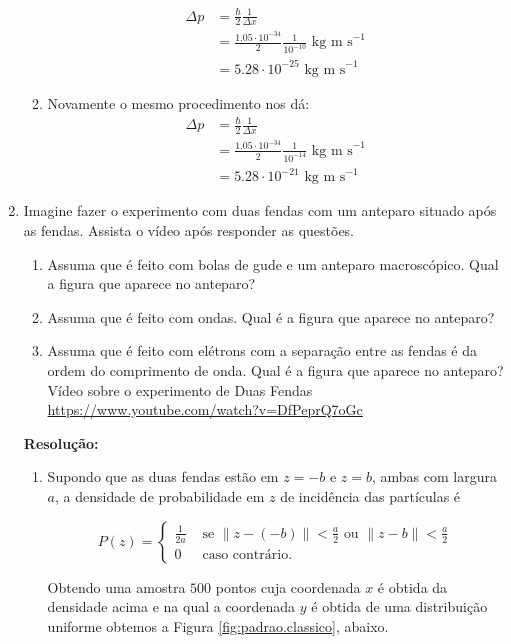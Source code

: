 \documentclass[a4paper, 12pt, notitlepage]{article}
\begin{document}
\begin{enumerate}
\begin{enumerate}
  \begin{align*}
  \Delta p &= \frac{\hbar}{2} \frac{1}{\Delta x} \\
  &= \frac{1.05 \cdot 10^{-34}}{2} \frac{1}{10^{-10}} \text{ kg m s}^{-1} \\
  &= 5.28 \cdot 10^{-25} \text{ kg m s}^{-1}
  \end{align*}
  
  \item Novamente o mesmo procedimento nos dá:
  \begin{align*}
  \Delta p &= \frac{\hbar}{2} \frac{1}{\Delta x} \\
  &= \frac{1.05 \cdot 10^{-34}}{2} \frac{1}{10^{-14}} \text{ kg m s}^{-1} \\
  &= 5.28 \cdot 10^{-21} \text{ kg m s}^{-1}
  \end{align*}
\end{enumerate}

\item Imagine fazer o experimento com duas fendas com um anteparo situado após as fendas. Assista o vídeo após responder as questões.
\begin{enumerate}
  \item Assuma que é feito com bolas de gude e um anteparo macroscópico. Qual a figura que aparece no anteparo?
  \item Assuma que é feito com ondas. Qual é a figura que aparece no anteparo?
  \item Assuma que é feito com elétrons com a separação entre as fendas é da ordem do comprimento de onda. Qual é a figura que aparece no anteparo?
  Vídeo sobre o experimento de Duas Fendas \url{https://www.youtube.com/watch?v=DfPeprQ7oGc}
\end{enumerate}
\textbf{Resolução: }\linebreak
\begin{enumerate}
  \item Supondo que as duas fendas estão em $z = -b$ e $z = b$, ambas com largura $a$, a densidade de probabilidade em $z$ de incidência das partículas é

$$ P(z) = \begin{cases} \frac{1}{2a} &\text{ se }\|z - (-b)\| < \frac{a}{2} \text{ ou } \|z - b\| < \frac{a}{2} \\
0 &\text{ caso contrário.}\end{cases} $$

Obtendo uma amostra $500$ pontos cuja coordenada $x$ é obtida da densidade acima e na qual a coordenada $y$ é obtida de uma distribuição uniforme obtemos a Figura \ref{fig:padrao.classico}, abaixo.


\end{enumerate}
\end{enumerate}
\end{document}
